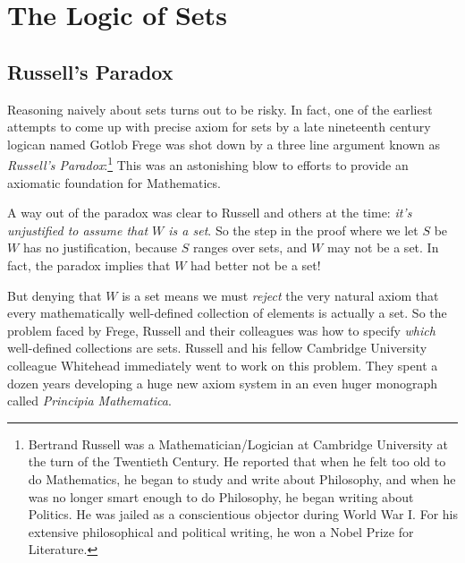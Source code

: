 \section{The Logic of Sets}

\subsection{Russell's Paradox}

Reasoning naively about sets turns out to be risky.  In fact, one of the
earliest attempts to come up with precise axiom for sets by a late
nineteenth century logican named Gotlob Frege was shot down by a three
line argument known as \emph{Russell's Paradox}:\footnote{Bertrand Russell
  was a Mathematician/Logician at Cambridge University at the turn of the
  Twentieth Century.  He reported that when he felt too old to do
  Mathematics, he began to study and write about Philosophy, and when he
  was no longer smart enough to do Philosophy, he began writing about
  Politics.  He was jailed as a conscientious objector during World War I.
  For his extensive philosophical and political writing, he won a Nobel
  Prize for Literature.}  This was an astonishing blow to efforts to
provide an axiomatic foundation for Mathematics.


A way out of the paradox was clear to Russell and others at the time:
\emph{it's unjustified to assume that $W$ is a set}.  So the step in the
proof where we let $S$ be $W$ has no justification, because $S$ ranges
over sets, and $W$ may not be a set.  In fact, the paradox implies that
$W$ had better not be a set!

But denying that $W$ is a set means we must \emph{reject} the very natural
axiom that every mathematically well-defined collection of elements is
actually a set.  So the problem faced by Frege, Russell and their
colleagues was how to specify \emph{which} well-defined collections are
sets.  Russell and his fellow Cambridge University colleague Whitehead
immediately went to work on this problem.  They spent a dozen years
developing a huge new axiom system in an even huger monograph called
\emph{Principia Mathematica}.


